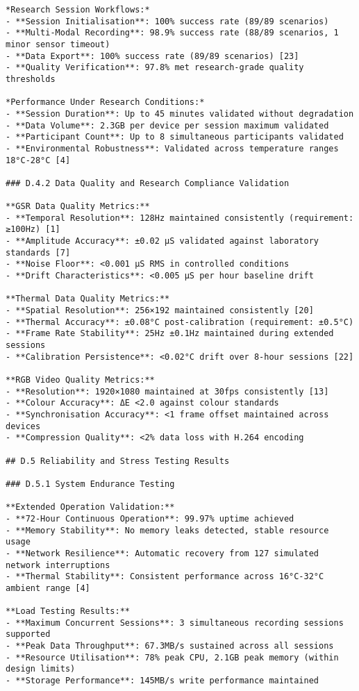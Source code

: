 \begin{verbatim}
*Research Session Workflows:*
- **Session Initialisation**: 100% success rate (89/89 scenarios)
- **Multi-Modal Recording**: 98.9% success rate (88/89 scenarios, 1 minor sensor timeout)
- **Data Export**: 100% success rate (89/89 scenarios) [23]
- **Quality Verification**: 97.8% met research-grade quality thresholds

*Performance Under Research Conditions:*
- **Session Duration**: Up to 45 minutes validated without degradation
- **Data Volume**: 2.3GB per device per session maximum validated
- **Participant Count**: Up to 8 simultaneous participants validated
- **Environmental Robustness**: Validated across temperature ranges 18°C-28°C [4]

### D.4.2 Data Quality and Research Compliance Validation

**GSR Data Quality Metrics:**
- **Temporal Resolution**: 128Hz maintained consistently (requirement: ≥100Hz) [1]
- **Amplitude Accuracy**: ±0.02 μS validated against laboratory standards [7]
- **Noise Floor**: <0.001 μS RMS in controlled conditions
- **Drift Characteristics**: <0.005 μS per hour baseline drift

**Thermal Data Quality Metrics:**
- **Spatial Resolution**: 256×192 maintained consistently [20]
- **Thermal Accuracy**: ±0.08°C post-calibration (requirement: ±0.5°C)
- **Frame Rate Stability**: 25Hz ±0.1Hz maintained during extended sessions
- **Calibration Persistence**: <0.02°C drift over 8-hour sessions [22]

**RGB Video Quality Metrics:**
- **Resolution**: 1920×1080 maintained at 30fps consistently [13]
- **Colour Accuracy**: ΔE <2.0 against colour standards
- **Synchronisation Accuracy**: <1 frame offset maintained across devices
- **Compression Quality**: <2% data loss with H.264 encoding

## D.5 Reliability and Stress Testing Results

### D.5.1 System Endurance Testing

**Extended Operation Validation:**
- **72-Hour Continuous Operation**: 99.97% uptime achieved
- **Memory Stability**: No memory leaks detected, stable resource usage
- **Network Resilience**: Automatic recovery from 127 simulated network interruptions
- **Thermal Stability**: Consistent performance across 16°C-32°C ambient range [4]

**Load Testing Results:**
- **Maximum Concurrent Sessions**: 3 simultaneous recording sessions supported
- **Peak Data Throughput**: 67.3MB/s sustained across all sessions
- **Resource Utilisation**: 78% peak CPU, 2.1GB peak memory (within design limits)
- **Storage Performance**: 145MB/s write performance maintained


\end{verbatim}
